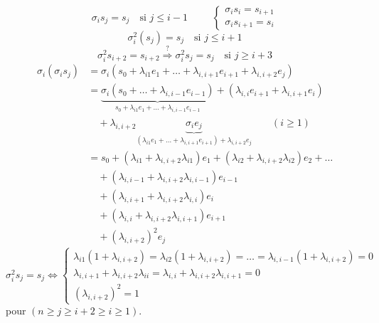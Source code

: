 \documentclass[11pt,a4paper]{article}
\begin{document}
\[
\boxed{\ \sigma_i s_j = s_j \quad\text{si } j\leq i-1\ }
\qquad
\boxed{\ \begin{cases} \sigma_i s_i = s_{i+1} \\ \sigma_i s_{i+1} = s_i \end{cases}\ }
\]
\[
\sigma_i^2(s_j) = s_j \quad\text{si } j\leq i+1
\]
\[
\sigma_i^2 s_{i+2} = s_{i+2} \overset{?}{\Longrightarrow} \sigma_i^2 s_j = s_j \quad\text{si } j\geq i+3
\]
\[
\begin{aligned}
\sigma_i(\sigma_i s_j) &= \sigma_i(s_0+\lambda_{i1}e_1+\dots+\lambda_{i,i+1}e_{i+1}+\lambda_{i,i+2}e_j) \\
&= \underbrace{\sigma_i(s_0+\dots+\lambda_{i,i-1}e_{i-1})}_{s_0+\lambda_{i1}e_1+\dots+\lambda_{i,i-1}e_{i-1}} + (\lambda_{i,i}e_{i+1}+\lambda_{i,i+1}e_i) \\
&\quad + \lambda_{i,i+2}\underbrace{\sigma_i e_j}_{(\lambda_{i1}e_1+\dots+\lambda_{i,i+1}e_{i+1})+\lambda_{i,i+2}e_j} \qquad (i\geq 1) \\
&= s_0+(\lambda_{i1}+\lambda_{i,i+2}\lambda_{i1})e_1+(\lambda_{i2}+\lambda_{i,i+2}\lambda_{i2})e_2+\dots \\
&\quad +(\lambda_{i,i-1}+\lambda_{i,i+2}\lambda_{i,i-1})e_{i-1} \\
&\quad +(\lambda_{i,i+1}+\lambda_{i,i+2}\lambda_{i,i})e_i \\
&\quad +(\lambda_{i,i}+\lambda_{i,i+2}\lambda_{i,i+1})e_{i+1} \\
&\quad +(\lambda_{i,i+2})^2e_j
\end{aligned}
\]
\[
\sigma_i^2 s_j = s_j \iff
\begin{cases}
\lambda_{i1}(1+\lambda_{i,i+2}) = \lambda_{i2}(1+\lambda_{i,i+2}) = \dots = \lambda_{i,i-1}(1+\lambda_{i,i+2}) = 0 \\
\lambda_{i,i+1}+\lambda_{i,i+2}\lambda_{ii} = \lambda_{i,i}+\lambda_{i,i+2}\lambda_{i,i+1} = 0 \\
(\lambda_{i,i+2})^2 = 1
\end{cases}
\]
\struck{(\ill{})} pour $(n\geq j\geq i+2\geq i\geq 1)$.

\end{document}

